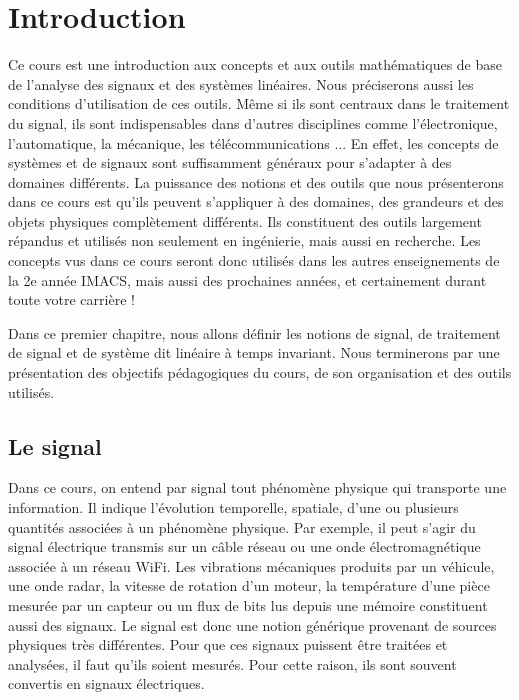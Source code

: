 \chapter{Introduction}
	
	Ce cours est une introduction aux concepts et aux outils mathématiques de base de l'analyse des signaux et des systèmes linéaires. Nous préciserons aussi les conditions d'utilisation de ces outils. Même si ils sont centraux dans le traitement du signal, ils sont indispensables dans d'autres disciplines comme l'électronique, l'automatique, la mécanique, les télécommunications ... En effet, les concepts de systèmes et de signaux sont suffisamment généraux pour s'adapter à des domaines différents. La puissance des notions et des outils que nous présenterons dans ce cours est qu'ils peuvent s'appliquer à des domaines, des grandeurs et des objets physiques complètement différents. Ils constituent des outils largement répandus et utilisés non seulement en ingénierie, mais aussi en recherche.	Les concepts vus dans ce cours seront donc utilisés dans les autres enseignements de la 2e année IMACS, mais aussi des prochaines années, et certainement durant toute votre carrière !
	
	Dans ce premier chapitre, nous allons définir les notions de signal, de traitement de signal et de système dit linéaire à temps invariant. Nous terminerons par une présentation des objectifs pédagogiques du cours, de son organisation et des outils utilisés.
	
	

	
	\section{Le signal}
	
	Dans ce cours, on entend par signal tout phénomène physique qui transporte une information. Il indique l'évolution temporelle, spatiale, d'une ou plusieurs quantités associées à un phénomène physique. Par exemple, il peut s'agir du signal électrique transmis sur un câble réseau ou une onde électromagnétique associée à un réseau WiFi. Les vibrations mécaniques produits par un véhicule, une onde radar, la vitesse de rotation d'un moteur, la température d'une pièce mesurée par un capteur ou un flux de bits lus depuis une mémoire constituent aussi des signaux. Le signal est donc une notion générique provenant de sources physiques très différentes. Pour que ces signaux puissent être traitées et analysées, il faut qu'ils soient mesurés. Pour cette raison, ils sont souvent convertis en signaux électriques.
	
